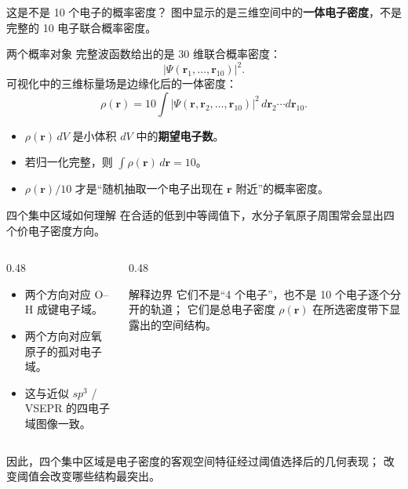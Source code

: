 \documentclass[aspectratio=169,11pt]{ctexbeamer}
\begin{document}
\begin{frame}{这是不是 10 个电子的概率密度？}
  \small
  图中显示的是三维空间中的\textbf{一体电子密度}，不是完整的 10 电子联合概率密度。

  \begin{block}{两个概率对象}
    完整波函数给出的是 $30$ 维联合概率密度：
    \[
      |\Psi(\mathbf r_1,\ldots,\mathbf r_{10})|^2 .
    \]
    可视化中的三维标量场是边缘化后的一体密度：
    \[
      \rho(\mathbf r)
      =
      10\int |\Psi(\mathbf r,\mathbf r_2,\ldots,\mathbf r_{10})|^2
      \,d\mathbf r_2\cdots d\mathbf r_{10}.
    \]
  \end{block}

  \begin{itemize}
    \item $\rho(\mathbf r)\,dV$ 是小体积 $dV$ 中的\textbf{期望电子数}。
    \item 若归一化完整，则 $\int\rho(\mathbf r)\,d\mathbf r=10$。
    \item $\rho(\mathbf r)/10$ 才是“随机抽取一个电子出现在 $\mathbf r$ 附近”的概率密度。
  \end{itemize}
\end{frame}

\begin{frame}{四个集中区域如何理解}
  \small
  在合适的低到中等阈值下，水分子氧原子周围常会显出四个价电子密度方向。

  \begin{columns}
    \begin{column}{0.48\linewidth}
      \begin{itemize}
        \item 两个方向对应 O--H 成键电子域。
        \item 两个方向对应氧原子的孤对电子域。
        \item 这与近似 $sp^3$ / VSEPR 的四电子域图像一致。
      \end{itemize}
    \end{column}
    \begin{column}{0.48\linewidth}
      \begin{block}{解释边界}
        它们不是“4 个电子”，也不是 10 个电子逐个分开的轨道；
        它们是总电子密度 $\rho(\mathbf r)$ 在所选密度带下显露出的空间结构。
      \end{block}
    \end{column}
  \end{columns}

  \vspace{0.5em}
  因此，四个集中区域是电子密度的客观空间特征经过阈值选择后的几何表现；
  改变阈值会改变哪些结构最突出。
\end{frame}
\end{document}
